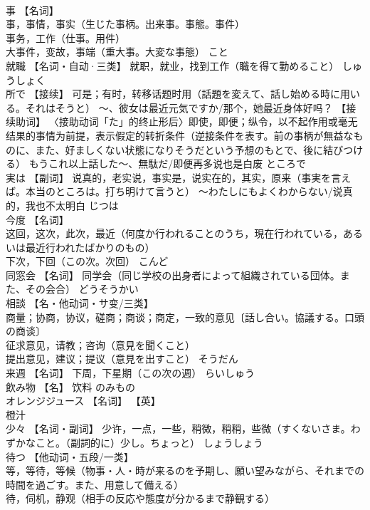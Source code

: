 \documentclass[8pt]{extreport}
\begin{document}
\begin{CJK}{UTF8}{min}
\\	事	【名词】 
\\	事，事情，事实（生じた事柄。出来事。事態。事件） 
\\	事务，工作（仕事。用件） 
\\	大事件，变故，事端（重大事。大変な事態）	こと	
\\	就職	【名词・自动·三类】 就职，就业，找到工作（職を得て勤めること）	しゅうしょく	
\\	所で	【接续】 可是；有时，转移话题时用（話題を変えて、話し始める時に用いる。それはそうと） 〜、彼女は最近元気ですか/那个，她最近身体好吗？ 【接续助词】 〈接助动词「た」的终止形后〉即使，即便；纵令，以不起作用或毫无结果的事情为前提，表示假定的转折条件（逆接条件を表す。前の事柄が無益なものに、また、好ましくない状態になりそうだという予想のもとで、後に結びつける） もうこれ以上話した〜、無駄だ/即便再多说也是白废	ところで	
\\	実は	【副词】 说真的，老实说，事实是，说实在的，其实，原来（事実を言えば。本当のところは。打ち明けて言うと） ～わたしにもよくわからない/说真的，我也不太明白	じつは	
\\	今度	【名词】 
\\	这回，这次，此次，最近（何度か行われることのうち，現在行われている，あるいは最近行われたばかりのもの） 
\\	下次，下回（この次。次回）	こんど	
\\	同窓会	【名词】 同学会（同じ学校の出身者によって組織されている団体。また、その会合）	どうそうかい	
\\	相談	【名・他动词・サ变/三类】 
\\	商量；协商，协议，磋商；商谈；商定，一致的意见〔話し合い。協議する。口頭の商谈〕 
\\	征求意见，请教；咨询（意見を聞くこと） 
\\	提出意见，建议；提议（意見を出すこと）	そうだん	
\\	来週	【名词】 下周，下星期（この次の週）	らいしゅう	
\\	飲み物	【名】 饮料	のみもの	
\\	オレンジジュース	【名词】 【英】
\\	橙汁		
\\	少々	【名词・副词】 少许，一点，一些，稍微，稍稍，些微（すくないさま。わずかなこと。（副詞的に）少し。ちょっと）	しょうしょう	
\\	待つ	【他动词・五段/一类】 
\\	等，等待，等候（物事・人・時が来るのを予期し、願い望みながら、それまでの時間を過ごす。また、用意して備える） 
\\	待，伺机，静观（相手の反応や態度が分かるまで静観する） 

\end{CJK}
\end{document}
